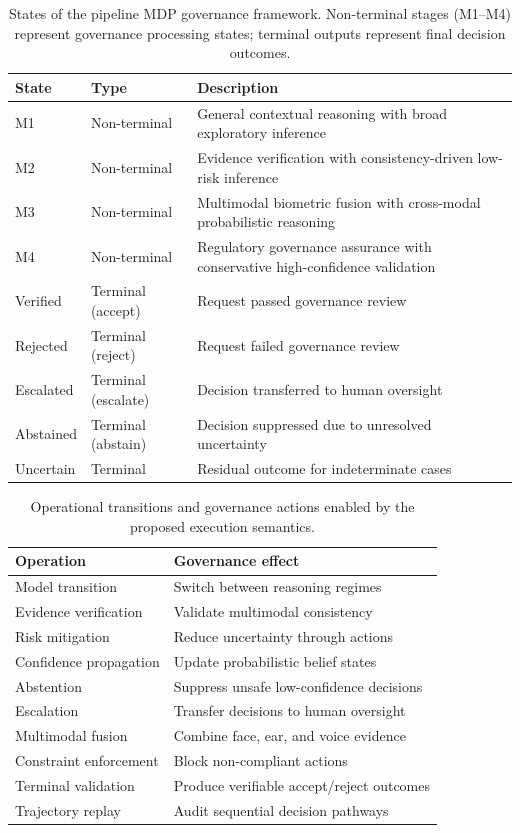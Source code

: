 \documentclass{article}
\begin{document}
\begin{table}[t]
\centering
\caption{States of the pipeline MDP governance framework. Non-terminal stages (M1--M4) represent governance processing states; terminal outputs represent final decision outcomes.}
\small
\begin{tabular}{lll}
\hline
State & Type & Description \\
\hline
M1 & Non-terminal & General contextual reasoning with broad exploratory inference \\
M2 & Non-terminal & Evidence verification with consistency-driven low-risk inference \\
M3 & Non-terminal & Multimodal biometric fusion with cross-modal probabilistic reasoning \\
M4 & Non-terminal & Regulatory governance assurance with conservative high-confidence validation \\
\hline
Verified & Terminal (accept) & Request passed governance review \\
Rejected & Terminal (reject) & Request failed governance review \\
Escalated & Terminal (escalate) & Decision transferred to human oversight \\
Abstained & Terminal (abstain) & Decision suppressed due to unresolved uncertainty \\
Uncertain & Terminal & Residual outcome for indeterminate cases \\
\hline
\end{tabular}
\label{tab:models}
\end{table}

\begin{table}[t!]
\centering
\caption{Operational transitions and governance actions enabled by the proposed execution semantics.}
\small
\begin{tabular}{ll}
\hline
Operation & Governance effect \\
\hline
Model transition & Switch between reasoning regimes \\
Evidence verification & Validate multimodal consistency \\
Risk mitigation & Reduce uncertainty through actions \\
Confidence propagation & Update probabilistic belief states \\
Abstention & Suppress unsafe low-confidence decisions \\
Escalation & Transfer decisions to human oversight \\
Multimodal fusion & Combine face, ear, and voice evidence \\
Constraint enforcement & Block non-compliant actions \\
Terminal validation & Produce verifiable accept/reject outcomes \\
Trajectory replay & Audit sequential decision pathways \\
\hline
\end{tabular}
\label{tab:operations}
\end{table}
\end{document}
